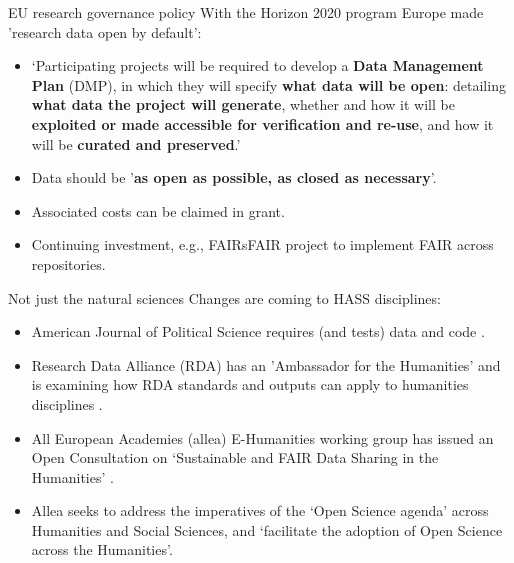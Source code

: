 \documentclass[aspectratio=169, 11pt]{beamer} %
\begin{document}
\begin{frame}{EU research governance policy}
  With the Horizon 2020 program \cite{European_Commission2019-an} Europe made 'research data open by default':
    \begin{itemize}[label=\textbullet]
        \item `Participating projects will be required to develop a \textbf{Data Management Plan} (DMP), in which they will specify \textbf{what data will be open}: detailing \textbf{what data the project will generate}, whether and how it will be \textbf{exploited or made accessible for verification and re-use}, and how it will be \textbf{curated and preserved}.'
        \item Data should be '\textbf{as open as possible, as closed as necessary}'.
        \item Associated costs can be claimed in grant.
        \item Continuing investment, e.g., FAIRsFAIR project \cite{Knaw-dans2019-sv} to implement FAIR across repositories.
    \end{itemize}
\end{frame}

\begin{frame}{Not just the natural sciences}
  Changes are coming to HASS disciplines:
    \begin{itemize}[label=\textbullet]
        \item American Journal of Political Science requires (and tests) data and code \cite{Jacoby2017-lw, Ajps2015-ex}.
        \item Research Data Alliance (RDA) has an 'Ambassador for the Humanities' and is examining how RDA standards and outputs can apply to humanities disciplines \cite{Rda2019-wc}.
        \item All European Academies (allea) E-Humanities working group \cite{Allea2019-wy} has issued an Open Consultation on `Sustainable and FAIR Data Sharing in the Humanities' \cite{Allea2019-aw}.
        \item Allea seeks to address the imperatives of the `Open Science agenda' across Humanities and Social Sciences, and `facilitate the adoption of Open Science across the Humanities'.
    \end{itemize}
\end{frame}
\end{document}

